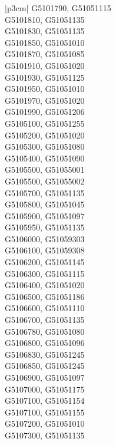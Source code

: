 \begin{customLongTable}{ |p{3cm}| }
G5101790, G51051115 \\ \hline
G5101810, G51051135 \\ \hline
G5101830, G51051135 \\ \hline
G5101850, G51051010 \\ \hline
G5101870, G51051085 \\ \hline
G5101910, G51051020 \\ \hline
G5101930, G51051125 \\ \hline
G5101950, G51051010 \\ \hline
G5101970, G51051020 \\ \hline
G5101990, G51051206 \\ \hline
G5105100, G51051255 \\ \hline
G5105200, G51051020 \\ \hline
G5105300, G51051080 \\ \hline
G5105400, G51051090 \\ \hline
G5105500, G51055001 \\ \hline
G5105500, G51055002 \\ \hline
G5105700, G51051135 \\ \hline
G5105800, G51051045 \\ \hline
G5105900, G51051097 \\ \hline
G5105950, G51051135 \\ \hline
G5106000, G51059303 \\ \hline
G5106100, G51059308 \\ \hline
G5106200, G51051145 \\ \hline
G5106300, G51051115 \\ \hline
G5106400, G51051020 \\ \hline
G5106500, G51051186 \\ \hline
G5106600, G51051110 \\ \hline
G5106700, G51051135 \\ \hline
G5106780, G51051080 \\ \hline
G5106800, G51051096 \\ \hline
G5106830, G51051245 \\ \hline
G5106850, G51051245 \\ \hline
G5106900, G51051097 \\ \hline
G5107000, G51051175 \\ \hline
G5107100, G51051154 \\ \hline
G5107100, G51051155 \\ \hline
G5107200, G51051010 \\ \hline
G5107300, G51051135 \\ \hline

\end{customLongTable}
